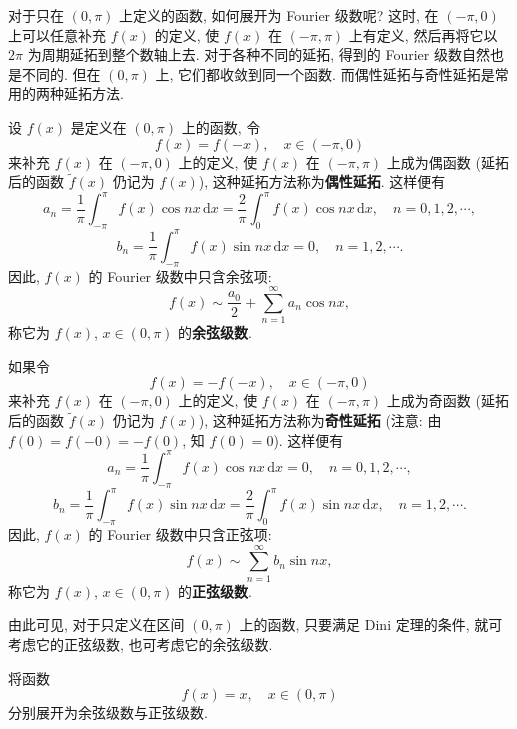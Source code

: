 对于只在 $(0,\pi)$ 上定义的函数, 如何展开为 Fourier 级数呢? 这时, 在 $(-\pi,0)$ 上可以任意补充 $f(x)$ 的定义, 使 $f(x)$ 在 $(-\pi,\pi)$ 上有定义, 然后再将它以 $2\pi$ 为周期延拓到整个数轴上去. 对于各种不同的延拓, 得到的 Fourier 级数自然也是不同的. 但在 $(0,\pi)$ 上, 它们都收敛到同一个函数. 而偶性延拓与奇性延拓是常用的两种延拓方法.

\begin{definition}\label{def:16.1.3}
设 $f(x)$ 是定义在 $(0,\pi)$ 上的函数, 令
\[
  f(x)=f(-x),\quad x\in(-\pi,0)
\]
来补充 $f(x)$ 在 $(-\pi,0)$ 上的定义, 使 $f(x)$ 在 $(-\pi,\pi)$ 上成为偶函数 (延拓后的函数 $\tilde{f}(x)$ 仍记为 $f(x)$), 这种延拓方法称为\textbf{偶性延拓}. 这样便有
\[
  a_{n}=\frac{1}{\pi}\int_{-\pi}^{\pi}f(x)\cos nx\,\mathrm{d}x=\frac{2}{\pi}\int_{0}^{\pi}f(x)\cos nx\,\mathrm{d}x,\quad n=0,1,2,\cdots,
\]
\[
  b_{n}=\frac{1}{\pi}\int_{-\pi}^{\pi}f(x)\sin nx\,\mathrm{d}x=0,\quad n=1,2,\cdots.
\]
因此, $f(x)$ 的 Fourier 级数中只含余弦项:
\[
  f(x)\sim\frac{a_{0}}{2}+\sum_{n=1}^{\infty}a_{n}\cos nx,
\]
称它为 $f(x)$, $x\in(0,\pi)$ 的\textbf{余弦级数}.

如果令
\[
  f(x)=-f(-x),\quad x\in(-\pi,0)
\]
来补充 $f(x)$ 在 $(-\pi,0)$ 上的定义, 使 $f(x)$ 在 $(-\pi,\pi)$ 上成为奇函数 (延拓后的函数 $\tilde{f}(x)$ 仍记为 $f(x)$), 这种延拓方法称为\textbf{奇性延拓} (注意: 由 $f(0)=f(-0)=-f(0)$, 知 $f(0)=0$). 这样便有
\[
  a_{n}=\frac{1}{\pi}\int_{-\pi}^{\pi}f(x)\cos nx\,\mathrm{d}x=0,\quad n=0,1,2,\cdots,
\]
\[
  b_{n}=\frac{1}{\pi}\int_{-\pi}^{\pi}f(x)\sin nx\,\mathrm{d}x=\frac{2}{\pi}\int_{0}^{\pi}f(x)\sin nx\,\mathrm{d}x,\quad n=1,2,\cdots.
\]
因此, $f(x)$ 的 Fourier 级数中只含正弦项:
\[
  f(x)\sim\sum_{n=1}^{\infty}b_{n}\sin nx,
\]
称它为 $f(x)$, $x\in(0,\pi)$ 的\textbf{正弦级数}.
\end{definition}

由此可见, 对于只定义在区间 $(0,\pi)$ 上的函数, 只要满足 Dini 定理的条件, 就可考虑它的正弦级数, 也可考虑它的余弦级数.

\begin{example}\label{ex:16.1.7}
将函数
\[
  f(x)=x,\quad x\in(0,\pi)
\]
分别展开为余弦级数与正弦级数.
\end{example}

